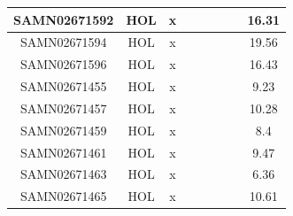 \documentclass[../main.tex]{subfiles}
\begin{document}
\begin{flushleft}
\begin{footnotesize}
\begin{longtable}{|c|c|c|c|c|c|c|}
    \hline
    SAMN02671592  & HOL   & x                                                            & ~          & ~                                                                           & ~                                                                 & 16.31     \\ 
    \hline
    SAMN02671594  & HOL   & x                                                            & ~          & ~                                                                           & ~                                                                 & 19.56     \\ 
    \hline
    SAMN02671596  & HOL   & x                                                            & ~          & ~                                                                           & ~                                                                 & 16.43     \\ 
    \hline
    SAMN02671455  & HOL   & x                                                            & ~          & ~                                                                           & ~                                                                 & 9.23      \\ 
    \hline
    SAMN02671457  & HOL   & x                                                            & ~          & ~                                                                           & ~                                                                 & 10.28     \\ 
    \hline
    SAMN02671459  & HOL   & x                                                            & ~          & ~                                                                           & ~                                                                 & 8.4       \\ 
    \hline
    SAMN02671461  & HOL   & x                                                            & ~          & ~                                                                           & ~                                                                 & 9.47      \\ 
    \hline
    SAMN02671463  & HOL   & x                                                            & ~          & ~                                                                           & ~                                                                 & 6.36      \\ 
    \hline
    SAMN02671465  & HOL   & x                                                            & ~          & ~                                                                           & ~                                                                 & 10.61     \\ 

\end{longtable}
\end{footnotesize}
\end{flushleft}
\end{document}
